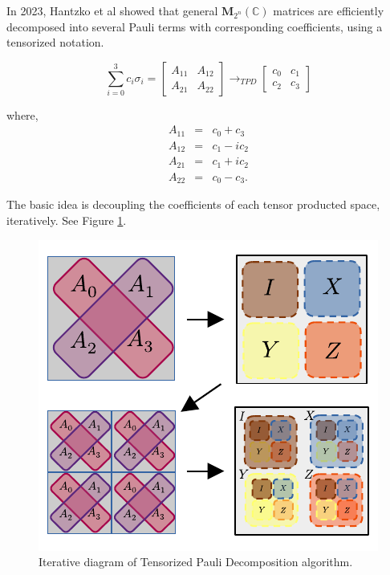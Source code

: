 \documentclass[twocolumn]{article}
\begin{document}
In 2023, Hantzko et al showed that 
general $\mathbf{M}_{2^n}(\mathbb{C})$ matrices are efficiently decomposed into 
several Pauli terms with corresponding coefficients, using a tensorized notation\cite{hantzko_tensorized_2023}.

\begin{equation}
    \sum_{i=0}^3 c_i \sigma_i = 
    \begin{bmatrix}
        A_{11} & A_{12}\\
        A_{21} & A_{22}
    \end{bmatrix}
    \rightarrow_{TPD}
    \begin{bmatrix}
        c_0 & c_1\\
        c_2 & c_3
    \end{bmatrix}
\end{equation}

where, 
\begin{equation}
    \label{eq:tpd_transform}
    \begin{array}{ccc}
        A_{11} & = &  c_0 + c_3\\
        A_{12} & = &  c_1 - i c_2\\
        A_{21} & = &  c_1 + i c_2\\
        A_{22} & = &  c_0 - c_3.
    \end{array}
\end{equation}

The basic idea is decoupling the coefficients of each tensor producted space, iteratively. 
See Figure \ref{fig:tpd_diagram}.

\begin{figure}[!h]
    \centering
    \includegraphics*{images/tpd_diagram.pdf}
    \caption{Iterative diagram of Tensorized Pauli Decomposition algorithm.}
    \label{fig:tpd_diagram}
\end{figure}
\end{document}
